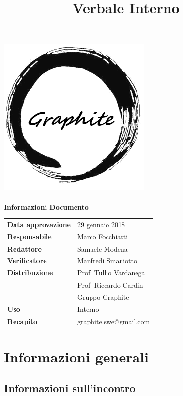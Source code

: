 \documentclass[openany,12pt,a4paper]{article}
\title{Verbale Interno}
\author{}
\begin{document}
	\makeatletter
	\begin{titlepage}
		\setlength{\headsep}{0pt}  
		\begin{center}
			\includegraphics[width=0.5\linewidth]{Logo.png}\\[1em]
			{\huge \bfseries  \@title }\\[10ex]
			\textbf{\Large Informazioni Documento} \\[2em]
			\bgroup
			\def\arraystretch{1.5}
			\begin{tabular}{l|l}
				\textbf{Data approvazione} & 29 gennaio 2018 \\
				\textbf{Responsabile} & Marco Focchiatti \\
				\textbf{Redattore} & Samuele Modena \\
				\textbf{Verificatore} & Manfredi Smaniotto \\
				\textbf{Distribuzione} & Prof. Tullio Vardanega \\
				 & Prof. Riccardo Cardin \\
				 & Gruppo Graphite \\
				\textbf{Uso} & Interno \\
				\textbf{Recapito} & graphite.swe@gmail.com \\
			\end{tabular}
		\egroup
		\end{center}
	\end{titlepage}
	\makeatother

	\thispagestyle{empty}
	\newpage
	
	\tableofcontents
	\newpage
	
	\section{Informazioni generali}
	
	\subsection{Informazioni sull'incontro}
	
\end{document}
